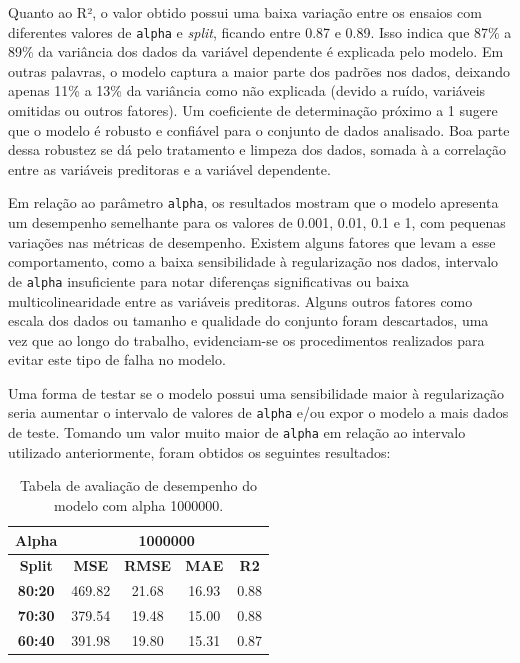 Quanto ao R², o valor obtido possui uma baixa variação entre os ensaios com diferentes valores de \texttt{alpha} e \textit{split}, ficando entre 0.87 e 0.89. Isso indica que 87\% a 89\% da variância dos dados da variável dependente é explicada pelo modelo. Em outras palavras, o modelo captura a maior parte dos padrões nos dados, deixando apenas 11\% a 13\% da variância como não explicada (devido a ruído, variáveis omitidas ou outros fatores). Um coeficiente de determinação próximo a 1 sugere que o modelo é robusto e confiável para o conjunto de dados analisado. Boa parte dessa robustez se dá pelo tratamento e limpeza dos dados, somada à a correlação entre as variáveis preditoras e a variável dependente.

Em relação ao parâmetro \texttt{alpha}, os resultados mostram que o modelo apresenta um desempenho semelhante para os valores de 0.001, 0.01, 0.1 e 1, com pequenas variações nas métricas de desempenho. Existem alguns fatores que levam a esse comportamento, como a baixa sensibilidade à regularização nos dados, intervalo de \texttt{alpha} insuficiente para notar diferenças significativas ou baixa multicolinearidade entre as variáveis preditoras. Alguns outros fatores como escala dos dados ou tamanho e qualidade do conjunto foram descartados, uma vez que ao longo do trabalho, evidenciam-se os procedimentos realizados para evitar este tipo de falha no modelo.

Uma forma de testar se o modelo possui uma sensibilidade maior à regularização seria aumentar o intervalo de valores de \texttt{alpha} e/ou expor o modelo a mais dados de teste. Tomando um valor muito maior de \texttt{alpha} em relação ao intervalo utilizado anteriormente, foram obtidos os seguintes resultados:

\begin{table}[H]
\centering
\begin{tabular}{|c|c|c|c|c|}
\hline
\textbf{Alpha} & \multicolumn{4}{|c|}{\textbf{1000000}} \\
\hline
\textbf{Split} & \textbf{MSE} & \textbf{RMSE} & \textbf{MAE} & \textbf{R2} \\
\hline
\textbf{80:20} & 469.82 & 21.68 & 16.93 & 0.88 \\
\textbf{70:30} & 379.54 & 19.48 & 15.00 & 0.88 \\
\textbf{60:40} & 391.98 & 19.80 & 15.31 & 0.87 \\
\hline
\end{tabular}
\caption{Tabela de avaliação de desempenho do modelo com alpha 1000000.}
\end{table}

